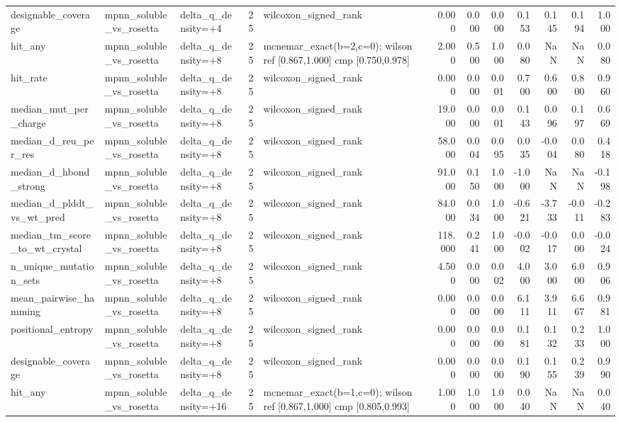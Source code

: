\begin{table}
{\begin{tabular}{lllrlrrrrrrr}
designable\_coverage & mpnn\_soluble\_vs\_rosetta & delta\_q\_density=+4 & 25 & wilcoxon\_signed\_rank & 0.000 & 0.000 & 0.000 & 0.153 & 0.145 & 0.194 & 1.000 \\
hit\_any & mpnn\_soluble\_vs\_rosetta & delta\_q\_density=+8 & 25 & mcnemar\_exact(b=2,c=0); wilson ref [0.867,1.000] cmp [0.750,0.978] & 2.000 & 0.500 & 1.000 & 0.080 & NaN & NaN & 0.080 \\
hit\_rate & mpnn\_soluble\_vs\_rosetta & delta\_q\_density=+8 & 25 & wilcoxon\_signed\_rank & 0.000 & 0.000 & 0.001 & 0.700 & 0.600 & 0.800 & 0.960 \\
median\_mut\_per\_charge & mpnn\_soluble\_vs\_rosetta & delta\_q\_density=+8 & 25 & wilcoxon\_signed\_rank & 19.000 & 0.000 & 0.001 & 0.143 & 0.096 & 0.197 & 0.669 \\
median\_d\_reu\_per\_res & mpnn\_soluble\_vs\_rosetta & delta\_q\_density=+8 & 25 & wilcoxon\_signed\_rank & 58.000 & 0.004 & 0.095 & 0.035 & -0.004 & 0.080 & 0.418 \\
median\_d\_hbond\_strong & mpnn\_soluble\_vs\_rosetta & delta\_q\_density=+8 & 25 & wilcoxon\_signed\_rank & 91.000 & 0.150 & 1.000 & -1.000 & NaN & NaN & -0.198 \\
median\_d\_plddt\_vs\_wt\_pred & mpnn\_soluble\_vs\_rosetta & delta\_q\_density=+8 & 25 & wilcoxon\_signed\_rank & 84.000 & 0.034 & 1.000 & -0.621 & -3.733 & -0.011 & -0.283 \\
median\_tm\_score\_to\_wt\_crystal & mpnn\_soluble\_vs\_rosetta & delta\_q\_density=+8 & 25 & wilcoxon\_signed\_rank & 118.000 & 0.241 & 1.000 & -0.002 & -0.017 & 0.000 & -0.024 \\
n\_unique\_mutation\_sets & mpnn\_soluble\_vs\_rosetta & delta\_q\_density=+8 & 25 & wilcoxon\_signed\_rank & 4.500 & 0.000 & 0.002 & 4.000 & 3.000 & 6.000 & 0.906 \\
mean\_pairwise\_hamming & mpnn\_soluble\_vs\_rosetta & delta\_q\_density=+8 & 25 & wilcoxon\_signed\_rank & 0.000 & 0.000 & 0.000 & 6.111 & 3.911 & 6.667 & 0.981 \\
positional\_entropy & mpnn\_soluble\_vs\_rosetta & delta\_q\_density=+8 & 25 & wilcoxon\_signed\_rank & 0.000 & 0.000 & 0.000 & 0.181 & 0.132 & 0.233 & 1.000 \\
designable\_coverage & mpnn\_soluble\_vs\_rosetta & delta\_q\_density=+8 & 25 & wilcoxon\_signed\_rank & 0.000 & 0.000 & 0.000 & 0.190 & 0.155 & 0.239 & 0.990 \\
hit\_any & mpnn\_soluble\_vs\_rosetta & delta\_q\_density=+16 & 25 & mcnemar\_exact(b=1,c=0); wilson ref [0.867,1.000] cmp [0.805,0.993] & 1.000 & 1.000 & 1.000 & 0.040 & NaN & NaN & 0.040 \\

\end{tabular}}
\end{table}
